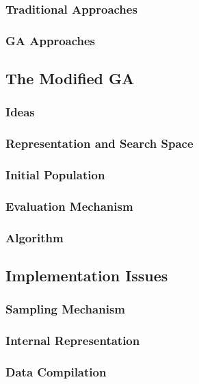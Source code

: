 \documentclass[../main.tex]{subfiles}
\begin{document}
\subsubsection{Traditional Approaches}

\subsubsection{GA Approaches}

\subsection{The Modified GA}

\subsubsection{Ideas}

\subsubsection{Representation and Search Space}

\subsubsection{Initial Population}

\subsubsection{Evaluation Mechanism}

\subsubsection{Algorithm}

\subsection{Implementation Issues}

\subsubsection{Sampling Mechanism}

\subsubsection{Internal Representation}

\subsubsection{Data Compilation}
\end{document}
